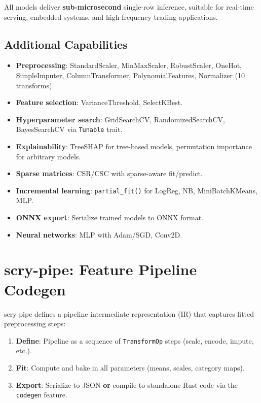 \documentclass[11pt,a4paper]{article}
\begin{document}
All models deliver \textbf{sub-microsecond} single-row inference,
suitable for real-time serving, embedded systems, and high-frequency
trading applications.

\subsection{Additional Capabilities}

\begin{itemize}[nosep]
    \item \textbf{Preprocessing}: StandardScaler, MinMaxScaler,
          RobustScaler, OneHot, SimpleImputer, ColumnTransformer,
          PolynomialFeatures, Normalizer (10 transforms).
    \item \textbf{Feature selection}: VarianceThreshold, SelectKBest.
    \item \textbf{Hyperparameter search}: GridSearchCV,
          RandomizedSearchCV, BayesSearchCV via \texttt{Tunable} trait.
    \item \textbf{Explainability}: TreeSHAP for tree-based models,
          permutation importance for arbitrary models.
    \item \textbf{Sparse matrices}: CSR/CSC with sparse-aware fit/predict.
    \item \textbf{Incremental learning}: \texttt{partial\_fit()} for
          LogReg, NB, MiniBatchKMeans, MLP.
    \item \textbf{ONNX export}: Serialize trained models to ONNX format.
    \item \textbf{Neural networks}: MLP with Adam/SGD, Conv2D.
\end{itemize}

\section{scry-pipe: Feature Pipeline Codegen}

scry-pipe defines a pipeline intermediate representation (IR) that
captures fitted preprocessing steps:

\begin{enumerate}[nosep]
    \item \textbf{Define}: Pipeline as a sequence of
          \texttt{TransformOp} steps (scale, encode, impute, etc.).
    \item \textbf{Fit}: Compute and bake in all parameters
          (means, scales, category maps).
    \item \textbf{Export}: Serialize to JSON \textbf{or} compile to
          standalone Rust code via the \texttt{codegen} feature.
\end{enumerate}
\end{document}
